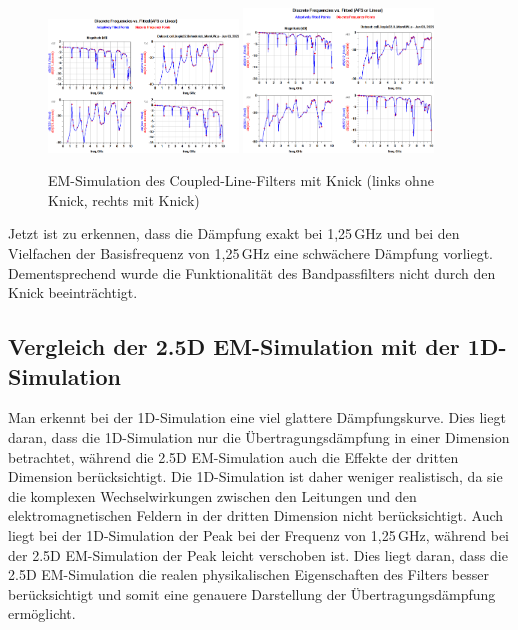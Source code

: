     \begin{figure}[H]
        \centering
        \includegraphics[width=0.45\textwidth]{Pictures/EMSimulationohneKnick.png}
        \includegraphics[width=0.45\textwidth]{Pictures/EMSimulationmitKnick.png}
        \caption{EM-Simulation des Coupled-Line-Filters mit Knick (links ohne Knick, rechts mit Knick)}
    \end{figure}

    Jetzt ist zu erkennen, dass die Dämpfung exakt bei 1,25\,GHz und bei den Vielfachen der Basisfrequenz von 1,25\,GHz eine schwächere Dämpfung vorliegt. Dementsprechend wurde die Funktionalität des Bandpassfilters nicht durch den Knick beeinträchtigt.


\subsection{Vergleich der 2.5D EM-Simulation mit der 1D-Simulation}
Man erkennt bei der 1D-Simulation eine viel glattere Dämpfungskurve. Dies liegt daran, dass die 1D-Simulation nur die Übertragungsdämpfung in einer Dimension betrachtet, während die 2.5D EM-Simulation auch die Effekte der dritten Dimension berücksichtigt.
Die 1D-Simulation ist daher weniger realistisch, da sie die komplexen Wechselwirkungen zwischen den Leitungen und den elektromagnetischen Feldern in der dritten Dimension nicht berücksichtigt.
Auch liegt bei der 1D-Simulation der Peak bei der Frequenz von 1,25\,GHz, während bei der 2.5D EM-Simulation der Peak leicht verschoben ist. Dies liegt daran, dass die 2.5D EM-Simulation die realen physikalischen Eigenschaften des Filters besser berücksichtigt und somit eine genauere Darstellung der Übertragungsdämpfung ermöglicht.

